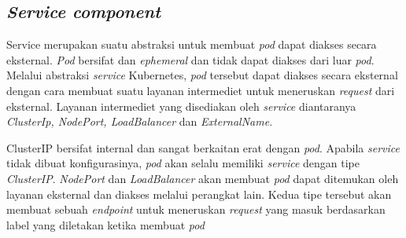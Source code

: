 \subsection{\textit{Service component}}

Service merupakan suatu abstraksi untuk membuat \textit{pod} dapat diakses secara eksternal. \textit{Pod} bersifat dan \textit{ephemeral} dan tidak dapat diakses dari luar \textit{pod}. Melalui abstraksi \textit{service} Kubernetes, \textit{pod} tersebut dapat diakses secara eksternal dengan cara membuat suatu layanan intermediet untuk meneruskan \textit{request} dari eksternal.
Layanan intermediet yang disediakan oleh \textit{service} diantaranya \textit{ClusterIp, NodePort, LoadBalancer} dan  \textit{ExternalName}.

ClusterIP bersifat internal dan sangat berkaitan erat dengan \textit{pod}. Apabila \textit{service} tidak dibuat konfigurasinya, \textit{pod} akan selalu memiliki \textit{service} dengan tipe \textit{ClusterIP}. \textit{NodePort} dan \textit{LoadBalancer} akan membuat \textit{pod} dapat ditemukan oleh layanan eksternal dan diakses melalui perangkat lain. Kedua tipe tersebut akan membuat sebuah \textit{endpoint} untuk meneruskan \textit{request} yang masuk berdasarkan label yang diletakan ketika membuat \textit{pod} \parencite{service}